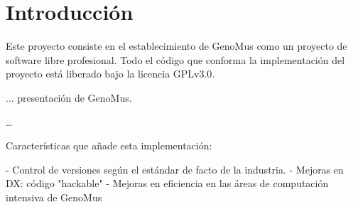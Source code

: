 \chapter{Introducción}

Este proyecto consiste en el establecimiento de GenoMus\cite{GenoMus} como un proyecto de software libre profesional. Todo el código que conforma la implementación del proyecto está liberado bajo la licencia GPLv3.0\cite{gplv3}.

... presentación de GenoMus.

\dots

Características que añade esta implementación:

 - Control de versiones según el estándar de facto de la industria.
 - Mejoras en DX: código "hackable"
 - Mejoras en eficiencia en las áreas de computación intensiva de GenoMus\cite{GenoMus}